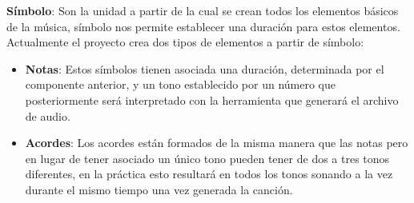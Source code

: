 \textbf{Símbolo}: Son la unidad a partir de la cual se crean todos los elementos básicos de la música, símbolo nos permite establecer una duración para estos elementos. Actualmente el proyecto crea dos tipos de elementos a partir de símbolo:
\begin{itemize}
\item \textbf{Notas}: Estos símbolos tienen asociada una duración, determinada por el componente anterior, y un tono establecido por un número que posteriormente será interpretado con la herramienta que generará el archivo de audio.
\item \textbf{Acordes}: Los acordes están formados de la misma manera que las notas pero en lugar de tener asociado un único tono pueden tener de dos a tres tonos diferentes, en la práctica esto resultará en todos los tonos sonando a la vez durante el mismo tiempo una vez generada la canción.
\end{itemize}
 
